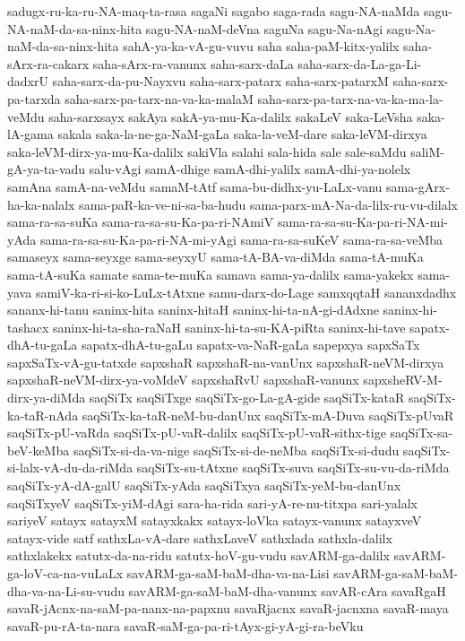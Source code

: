 {sadugx-ru-ka-ru-NA-maq-ta-rasa
sagaNi
sagabo
saga-rada
sagu-NA-naMda
sagu-NA-naM-da-sa-ninx-hita
sagu-NA-naM-deVna
saguNa
sagu-Na-nAgi
sagu-Na-naM-da-sa-ninx-hita
sahA-ya-ka-vA-gu-vuvu
saha
saha-paM-kitx-yalilx
saha-sArx-ra-cakarx
saha-sArx-ra-vanunx
saha-sarx-daLa
saha-sarx-da-La-ga-Li-dadxrU
saha-sarx-da-pu-Nayxvu
saha-sarx-patarx
saha-sarx-patarxM
saha-sarx-pa-tarxda
saha-sarx-pa-tarx-na-va-ka-malaM
saha-sarx-pa-tarx-na-va-ka-ma-la-veMdu
saha-sarxsayx
sakAya
sakA-ya-mu-Ka-dalilx
sakaLeV
saka-LeVsha
saka-lA-gama
sakala
saka-la-ne-ga-NaM-gaLa
saka-la-veM-dare
saka-leVM-dirxya
saka-leVM-dirx-ya-mu-Ka-dalilx
sakiVla
salahi
sala-hida
sale
sale-saMdu
saliM-gA-ya-ta-vadu
salu-vAgi
samA-dhige
samA-dhi-yalilx
samA-dhi-ya-nolelx
samAna
samA-na-veMdu
samaM-tAtf
sama-bu-didhx-yu-LaLx-vanu
sama-gArx-ha-ka-nalalx
sama-paR-ka-ve-ni-sa-ba-hudu
sama-parx-mA-Na-da-lilx-ru-vu-dilalx
sama-ra-sa-suKa
sama-ra-sa-su-Ka-pa-ri-NAmiV
sama-ra-sa-su-Ka-pa-ri-NA-mi-yAda
sama-ra-sa-su-Ka-pa-ri-NA-mi-yAgi
sama-ra-sa-suKeV
sama-ra-sa-veMba
samaseyx
sama-seyxge
sama-seyxyU
sama-tA-BA-va-diMda
sama-tA-muKa
sama-tA-suKa
samate
sama-te-muKa
samava
sama-ya-dalilx
sama-yakekx
sama-yava
samiV-ka-ri-si-ko-LuLx-tAtxne
samu-darx-do-Lage
samxqqtaH
sananxdadhx
sananx-hi-tanu
saninx-hita
saninx-hitaH
saninx-hi-ta-nA-gi-dAdxne
saninx-hi-tashacx
saninx-hi-ta-sha-raNaH
saninx-hi-ta-su-KA-piRta
saninx-hi-tave
sapatx-dhA-tu-gaLa
sapatx-dhA-tu-gaLu
sapatx-va-NaR-gaLa
sapepxya
sapxSaTx
sapxSaTx-vA-gu-tatxde
sapxshaR
sapxshaR-na-vanUnx
sapxshaR-neVM-dirxya
sapxshaR-neVM-dirx-ya-voMdeV
sapxshaRvU
sapxshaR-vanunx
sapxsheRV-M-dirx-ya-diMda
saqSiTx
saqSiTxge
saqSiTx-go-La-gA-gide
saqSiTx-kataR
saqSiTx-ka-taR-nAda
saqSiTx-ka-taR-neM-bu-danUnx
saqSiTx-mA-Duva
saqSiTx-pUvaR
saqSiTx-pU-vaRda
saqSiTx-pU-vaR-dalilx
saqSiTx-pU-vaR-sithx-tige
saqSiTx-sa-beV-keMba
saqSiTx-si-da-va-nige
saqSiTx-si-de-neMba
saqSiTx-si-dudu
saqSiTx-si-lalx-vA-du-da-riMda
saqSiTx-su-tAtxne
saqSiTx-suva
saqSiTx-su-vu-da-riMda
saqSiTx-yA-dA-galU
saqSiTx-yAda
saqSiTxya
saqSiTx-yeM-bu-danUnx
saqSiTxyeV
saqSiTx-yiM-dAgi
sara-ha-rida
sari-yA-re-nu-titxpa
sari-yalalx
sariyeV
satayx
satayxM
satayxkakx
satayx-loVka
satayx-vanunx
satayxveV
satayx-vide
satf
sathxLa-vA-dare
sathxLaveV
sathxlada
sathxla-dalilx
sathxlakekx
satutx-da-na-ridu
satutx-hoV-gu-vudu
savARM-ga-dalilx
savARM-ga-loV-ca-na-vuLaLx
savARM-ga-saM-baM-dha-va-na-Lisi
savARM-ga-saM-baM-dha-va-na-Li-su-vudu
savARM-ga-saM-baM-dha-vanunx
savAR-cAra
savaRgaH
savaR-jAcnx-na-saM-pa-nanx-na-papxnu
savaRjacnx
savaR-jacnxna
savaR-maya
savaR-pu-rA-ta-nara
savaR-saM-ga-pa-ri-tAyx-gi-yA-gi-ra-beVku
}
